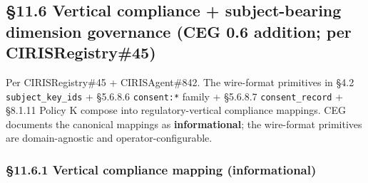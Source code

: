 \documentclass[10pt]{article}
\begin{document}
\subsection*{§11.6 Vertical compliance + subject-bearing dimension governance (CEG 0.6 addition; per CIRISRegistry\#45)}


Per CIRISRegistry\#45 + CIRISAgent\#842. The wire-format primitives in §4.2 \texttt{subject\_key\_ids} + §5.6.8.6 \texttt{consent:*} family + §5.6.8.7 \texttt{consent\_record} + §8.1.11 Policy K compose into regulatory-vertical compliance mappings. CEG documents the canonical mappings as \textbf{informational}; the wire-format primitives are domain-agnostic and operator-configurable.


\subsubsection*{§11.6.1 Vertical compliance mapping (informational)}
\end{document}

